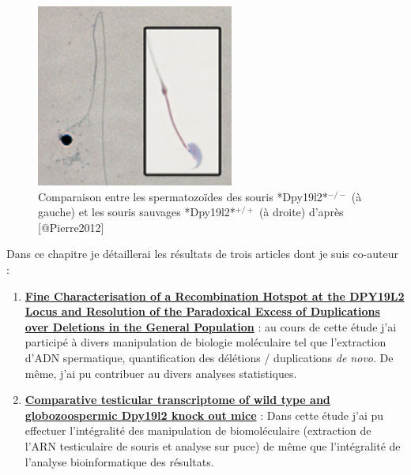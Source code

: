 \documentclass[12pt,twoside]{reedthesis}
\providecommand{\tightlist}{%
  \setlength{\itemsep}{0pt}\setlength{\parskip}{0pt}}
\theoremstyle{definition}
\theoremstyle{definition}
\theoremstyle{remark}
\begin{document}
  \begin{figure}
  
  {\centering \includegraphics[scale=0.8]{figure/mouse_globo_spz} 
  
  }
  
  \caption[Comparaison entre les spermatozoïdes des souris *Dpy19l2*$^{-/-}$ (à gauche) et les souris sauvages *Dpy19l2*$^{+/+}$ (à droite)]{Comparaison entre les spermatozoïdes des souris *Dpy19l2*$^{-/-}$ (à gauche) et les souris sauvages *Dpy19l2*$^{+/+}$ (à droite) d'après [@Pierre2012]}\label{fig:mouseglobo}
  \end{figure}
  
  Dans ce chapitre je détaillerai les résultats de trois articles dont je
  suis co-auteur :
  
  \begin{enumerate}
  \def\labelenumi{\arabic{enumi}.}
  \tightlist
  \item
    \protect\hyperlink{mecamut}{\textbf{Fine Characterisation of a
    Recombination Hotspot at the DPY19L2 Locus and Resolution of the
    Paradoxical Excess of Duplications over Deletions in the General
    Population}} : au cours de cette étude j'ai participé à divers
    manipulation de biologie moléculaire tel que l'extraction d'ADN
    spermatique, quantification des délétions / duplications \emph{de
    novo}. De même, j'ai pu contribuer au divers analyses statistiques.\\
  \item
    \protect\hyperlink{transcriptome}{\textbf{Comparative testicular
    transcriptome of wild type and globozoospermic Dpy19l2 knock out
    mice}} : Dans cette étude j'ai pu effectuer l'intégralité des
    manipulation de biomoléculaire (extraction de l'ARN testiculaire de
    souris et analyse sur puce) de même que l'intégralité de l'analyse
    bioinformatique des résultats.
  \end{enumerate}
  
\end{document}
